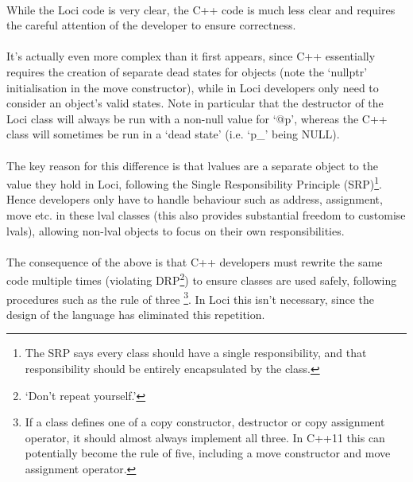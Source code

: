 \documentclass[12pt,twoside,notitlepage]{report}
\begin{document}
\paragraph{}
While the Loci code is very clear, the C++ code is much less clear and requires the careful attention of the developer to ensure correctness.

\paragraph{}
It's actually even more complex than it first appears, since C++ essentially requires the creation of separate dead states for objects (note the `nullptr' initialisation in the move constructor), while in Loci developers only need to consider an object's valid states. Note in particular that the destructor of the Loci class will always be run with a non-null value for `@p', whereas the C++ class will sometimes be run in a `dead state' (i.e. `p\_' being NULL).

\paragraph{}
The key reason for this difference is that lvalues are a separate object to the value they hold in Loci, following the Single Responsibility Principle (SRP)\footnote{The SRP says every class should have a single responsibility, and that responsibility should be entirely encapsulated by the class.}. Hence developers only have to handle behaviour such as address, assignment, move etc. in these lval classes (this also provides substantial freedom to customise lvals), allowing non-lval objects to focus on their own responsibilities.

\paragraph{}
The consequence of the above is that C++ developers must rewrite the same code multiple times (violating DRP\footnote{`Don't repeat yourself.'}) to ensure classes are used safely, following procedures such as the rule of three \footnote{If a class defines one of a copy constructor, destructor or copy assignment operator, it should almost always implement all three. In C++11 this can potentially become the rule of five, including a move constructor and move assignment operator.}. In Loci this isn't necessary, since the design of the language has eliminated this repetition.

\clearpage
\end{document}
